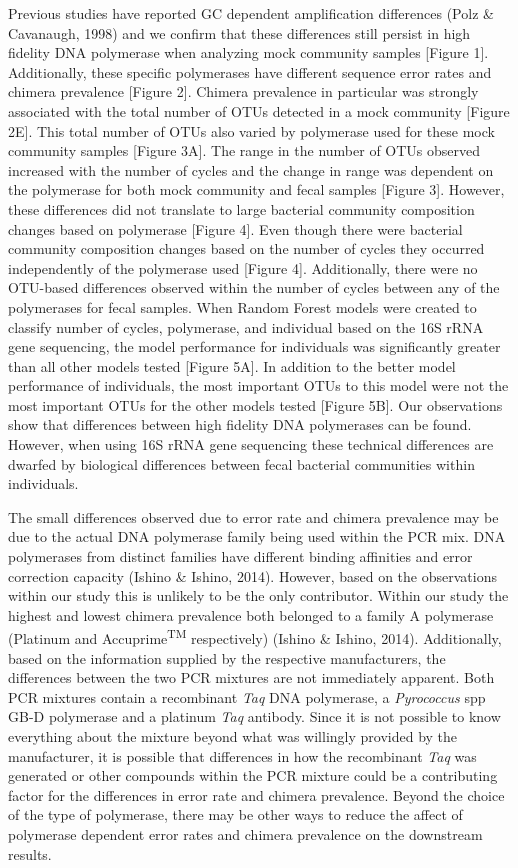 \documentclass[11pt,]{article}
\begin{document}
Previous studies have reported GC dependent amplification differences
(Polz \& Cavanaugh, 1998) and we confirm that these differences still
persist in high fidelity DNA polymerase when analyzing mock community
samples {[}Figure 1{]}. Additionally, these specific polymerases have
different sequence error rates and chimera prevalence {[}Figure 2{]}.
Chimera prevalence in particular was strongly associated with the total
number of OTUs detected in a mock community {[}Figure 2E{]}. This total
number of OTUs also varied by polymerase used for these mock community
samples {[}Figure 3A{]}. The range in the number of OTUs observed
increased with the number of cycles and the change in range was
dependent on the polymerase for both mock community and fecal samples
{[}Figure 3{]}. However, these differences did not translate to large
bacterial community composition changes based on polymerase {[}Figure
4{]}. Even though there were bacterial community composition changes
based on the number of cycles they occurred independently of the
polymerase used {[}Figure 4{]}. Additionally, there were no OTU-based
differences observed within the number of cycles between any of the
polymerases for fecal samples. When Random Forest models were created to
classify number of cycles, polymerase, and individual based on the 16S
rRNA gene sequencing, the model performance for individuals was
significantly greater than all other models tested {[}Figure 5A{]}. In
addition to the better model performance of individuals, the most
important OTUs to this model were not the most important OTUs for the
other models tested {[}Figure 5B{]}. Our observations show that
differences between high fidelity DNA polymerases can be found. However,
when using 16S rRNA gene sequencing these technical differences are
dwarfed by biological differences between fecal bacterial communities
within individuals.

The small differences observed due to error rate and chimera prevalence
may be due to the actual DNA polymerase family being used within the PCR
mix. DNA polymerases from distinct families have different binding
affinities and error correction capacity (Ishino \& Ishino, 2014).
However, based on the observations within our study this is unlikely to
be the only contributor. Within our study the highest and lowest chimera
prevalence both belonged to a family A polymerase (Platinum and
Accuprime\textsuperscript{TM} respectively) (Ishino \& Ishino, 2014).
Additionally, based on the information supplied by the respective
manufacturers, the differences between the two PCR mixtures are not
immediately apparent. Both PCR mixtures contain a recombinant \emph{Taq}
DNA polymerase, a \emph{Pyrococcus} spp GB-D polymerase and a platinum
\emph{Taq} antibody. Since it is not possible to know everything about
the mixture beyond what was willingly provided by the manufacturer, it
is possible that differences in how the recombinant \emph{Taq} was
generated or other compounds within the PCR mixture could be a
contributing factor for the differences in error rate and chimera
prevalence. Beyond the choice of the type of polymerase, there may be
other ways to reduce the affect of polymerase dependent error rates and
chimera prevalence on the downstream results.
\end{document}
